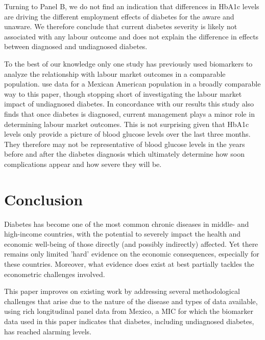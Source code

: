 Turning to Panel B, we do not find an indication that differences in \ac{HbA1c} levels are driving the different employment effects of diabetes for the aware and unaware. We therefore conclude that current diabetes severity is likely not associated with any labour outcome and does not explain the difference in effects between diagnosed and undiagnosed diabetes.

To the best of our knowledge only one study has previously used biomarkers to analyze the relationship with labour market outcomes in a comparable population. \textcite{BrownIII2011} use data for a Mexican American population in a broadly comparable way to this paper, though stopping short of investigating the labour market impact of undiagnosed diabetes. In concordance with our results this study also finds that once diabetes is diagnosed, current management plays a minor role in determining labour market outcomes. This is not surprising given that \ac{HbA1c} levels only provide a picture of blood glucose levels over the last three months. They therefore may not be representative of blood glucose levels in the years before and after the diabetes diagnosis which ultimately determine how soon complications appear and how severe they will be.
\FloatBarrier


\section{\label{sec:Conclusion}Conclusion}

Diabetes has become one of the most common chronic diseases in middle- and high-income countries, with the potential to severely impact the health and economic well-being of those directly (and possibly indirectly) affected. Yet there remains only limited 'hard' evidence on the economic consequences, especially for these countries. Moreover, what evidence does exist at best partially tackles the econometric challenges involved. 

This paper improves on existing work by addressing several methodological challenges that arise due to the nature of the disease and types of data available, using rich longitudinal panel data from Mexico, a \ac{MIC} for which the biomarker data used in this paper indicates that diabetes, including undiagnosed diabetes, has reached alarming levels.

